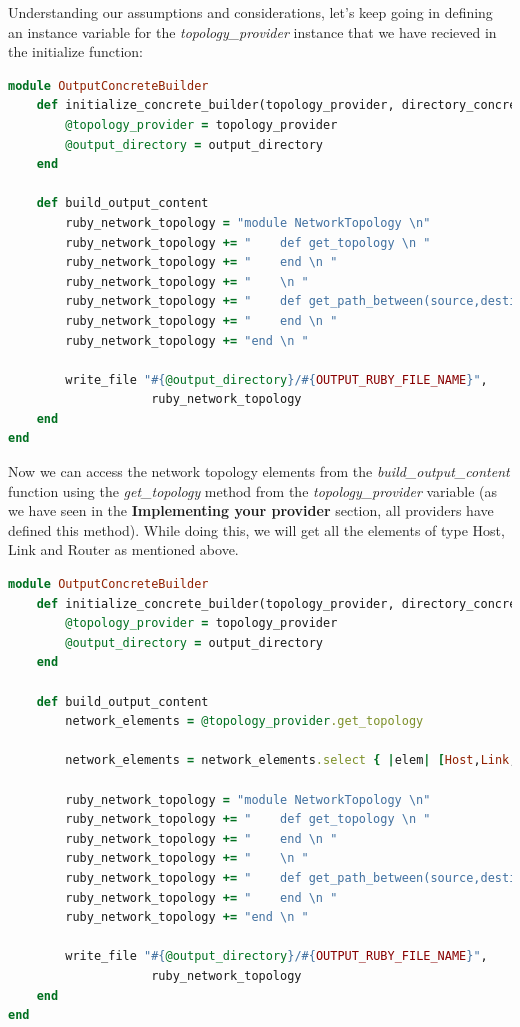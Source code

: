 Understanding our assumptions and considerations, let's keep going in defining an instance variable for the \textit{topology\_provider} instance that we have recieved in the initialize function:

\begin{lstlisting}[language=Ruby,breaklines=true]
module OutputConcreteBuilder
	def initialize_concrete_builder(topology_provider, directory_concrete_builders, output_directory)
		@topology_provider = topology_provider
		@output_directory = output_directory
	end
    
    def build_output_content
    	ruby_network_topology = "module NetworkTopology \n"
    	ruby_network_topology += "    def get_topology \n "
    	ruby_network_topology += "    end \n "
    	ruby_network_topology += "    \n "
    	ruby_network_topology += "    def get_path_between(source,destination) \n "
    	ruby_network_topology += "    end \n "
    	ruby_network_topology += "end \n "
    	
    	write_file "#{@output_directory}/#{OUTPUT_RUBY_FILE_NAME}",
                    ruby_network_topology
    end
end
\end{lstlisting}

Now we can access the network topology elements from the \textit{build\_output\_content} function using the \textit{get\_topology} method from the \textit{topology\_provider} variable (as we have seen in the \textbf{Implementing your provider} section, all providers have defined this method). While doing this, we will get all the elements of type Host, Link and Router as mentioned above. 

\begin{lstlisting}[language=Ruby,breaklines=true]
module OutputConcreteBuilder
	def initialize_concrete_builder(topology_provider, directory_concrete_builders, output_directory)
		@topology_provider = topology_provider
		@output_directory = output_directory
	end
    
    def build_output_content
		network_elements = @topology_provider.get_topology
        
        network_elements = network_elements.select { |elem| [Host,Link,Router].include? elem.class }    
    
    	ruby_network_topology = "module NetworkTopology \n"
    	ruby_network_topology += "    def get_topology \n "
    	ruby_network_topology += "    end \n "
    	ruby_network_topology += "    \n "
    	ruby_network_topology += "    def get_path_between(source,destination) \n "
    	ruby_network_topology += "    end \n "
    	ruby_network_topology += "end \n "
    	
    	write_file "#{@output_directory}/#{OUTPUT_RUBY_FILE_NAME}",
                    ruby_network_topology
    end
end
\end{lstlisting}

